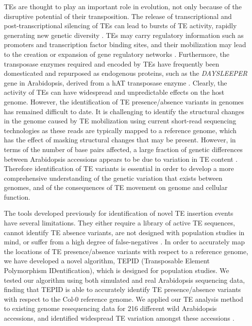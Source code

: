 \documentclass[12pt]{article}
\begin{document}
TEs are thought to play an important role in evolution, not only because
of the disruptive potential of their transposition. The release of
transcriptional and post-transcriptional silencing of TEs can lead to
bursts of TE activity, rapidly generating new genetic diversity
\cite{Vitte:2014he}. TEs may carry regulatory information such as
promoters and transcription factor binding sites, and their mobilization
may lead to the creation or expansion of gene regulatory networks
\cite{Henaff:2014hg, Bolger:2014bn, Ito:2011dga, Makarevitch:2015ho}.
Furthermore, the transposase enzymes required and encoded by TEs have
frequently been domesticated and repurposed as endogenous proteins, such
as the \emph{DAYSLEEPER} gene in Arabidopsis, derived from a hAT
transposase enzyme \cite{Bundock:2005gp}. Clearly, the activity of TEs
can have widespread and unpredictable effects on the host genome.
However, the identification of TE presence/absence variants in genomes
has remained difficult to date. It is challenging to identify the
structural changes in the genome caused by TE mobilization using current
short-read sequencing technologies as these reads are typically mapped
to a reference genome, which has the effect of masking structural
changes that may be present. However, in terms of the number of base
pairs affected, a large fraction of genetic differences between
Arabidopsis accessions appears to be due to variation in TE content
\cite{Cao:2011cf, Quadrana:2016bi}. Therefore identification of TE
variants is essential in order to develop a more comprehensive
understanding of the genetic variation that exists between genomes, and
of the consequences of TE movement on genome and cellular function.

The tools developed previously for identification of novel TE insertion
events have several limitations. They either require a library of active
TE sequences, cannot identify TE absence variants, are not designed
with population studies in mind, or suffer from a high degree of
false-negatives
\cite{Thung:2014ir, Robb:2013gw, Henaff:2015dl, Quadrana:2016bi}. In
order to accurately map the locations of TE presence/absence variants
with respect to a reference genome, we have developed a novel algorithm,
TEPID (Transposable Element Polymorphism IDentification), which is
designed for population studies. We tested our algorithm using both
simulated and real Arabidopsis sequencing data, finding that TEPID is
able to accurately identify TE presence/absence variants with respect to
the Col-0 reference genome. We applied our TE analysis method to
existing genome resequencing data for 216 different wild Arabidopsis
accessions, and identified widespread TE variation amongst these
accessions \cite{Schmitz:2013iu}.
\end{document}
